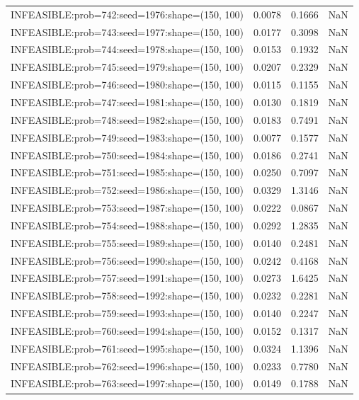 \begin{longtable}{lccc}
INFEASIBLE:prob=742:seed=1976:shape=(150, 100) &   0.0078 &  0.1666 &    NaN \\
INFEASIBLE:prob=743:seed=1977:shape=(150, 100) &   0.0177 &  0.3098 &    NaN \\
INFEASIBLE:prob=744:seed=1978:shape=(150, 100) &   0.0153 &  0.1932 &    NaN \\
INFEASIBLE:prob=745:seed=1979:shape=(150, 100) &   0.0207 &  0.2329 &    NaN \\
INFEASIBLE:prob=746:seed=1980:shape=(150, 100) &   0.0115 &  0.1155 &    NaN \\
INFEASIBLE:prob=747:seed=1981:shape=(150, 100) &   0.0130 &  0.1819 &    NaN \\
INFEASIBLE:prob=748:seed=1982:shape=(150, 100) &   0.0183 &  0.7491 &    NaN \\
INFEASIBLE:prob=749:seed=1983:shape=(150, 100) &   0.0077 &  0.1577 &    NaN \\
INFEASIBLE:prob=750:seed=1984:shape=(150, 100) &   0.0186 &  0.2741 &    NaN \\
INFEASIBLE:prob=751:seed=1985:shape=(150, 100) &   0.0250 &  0.7097 &    NaN \\
INFEASIBLE:prob=752:seed=1986:shape=(150, 100) &   0.0329 &  1.3146 &    NaN \\
INFEASIBLE:prob=753:seed=1987:shape=(150, 100) &   0.0222 &  0.0867 &    NaN \\
INFEASIBLE:prob=754:seed=1988:shape=(150, 100) &   0.0292 &  1.2835 &    NaN \\
INFEASIBLE:prob=755:seed=1989:shape=(150, 100) &   0.0140 &  0.2481 &    NaN \\
INFEASIBLE:prob=756:seed=1990:shape=(150, 100) &   0.0242 &  0.4168 &    NaN \\
INFEASIBLE:prob=757:seed=1991:shape=(150, 100) &   0.0273 &  1.6425 &    NaN \\
INFEASIBLE:prob=758:seed=1992:shape=(150, 100) &   0.0232 &  0.2281 &    NaN \\
INFEASIBLE:prob=759:seed=1993:shape=(150, 100) &   0.0140 &  0.2247 &    NaN \\
INFEASIBLE:prob=760:seed=1994:shape=(150, 100) &   0.0152 &  0.1317 &    NaN \\
INFEASIBLE:prob=761:seed=1995:shape=(150, 100) &   0.0324 &  1.1396 &    NaN \\
INFEASIBLE:prob=762:seed=1996:shape=(150, 100) &   0.0233 &  0.7780 &    NaN \\
INFEASIBLE:prob=763:seed=1997:shape=(150, 100) &   0.0149 &  0.1788 &    NaN \\

\end{longtable}
